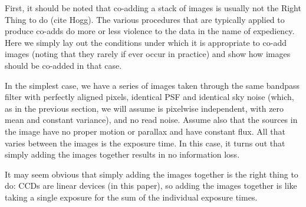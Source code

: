 \documentclass[letterpaper,preprint]{aastex}
\newcommand{\doctype}{paper}
\newcommand{\drawnfrom}{\sim}
\newcommand{\gaussianN}{\mathcal{N}}
\newcommand{\gaussian}[1]{\gaussianN\!\left(#1\right)}
\begin{document}
First, it should be noted that co-adding a stack of images is usually
not the Right Thing to do (cite Hogg).  The various procedures that
are typically applied to produce co-adds do more or less violence to
the data in the name of expediency.  Here we simply lay out the
conditions under which it is appropriate to co-add images (noting that
they rarely if ever occur in practice) and show how images should be
co-added in that case.


In the simplest case, we have a series of images taken through the
same bandpass filter with perfectly aligned pixels, identical PSF and
identical sky noise (which, as in the previous section, we will assume
is pixelwise independent, with zero mean and constant variance), and
no read noise.  Assume also that the sources in the image have no
proper motion or parallax and have constant flux.  All that varies
between the images is the exposure time.  In this case, it turns out
that simply adding the images together results in no information loss.


It may seem obvious that simply adding the images together is the
right thing to do: CCDs are linear devices (in this \doctype), so adding
the images together is like taking a single exposure for the sum of
the individual exposure times.


\end{document}
